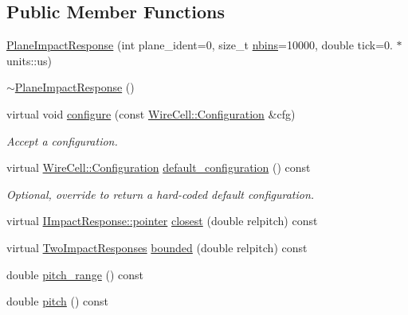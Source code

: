 \subsection*{Public Member Functions}
\begin{DoxyCompactItemize}
\item 
\hyperlink{class_wire_cell_1_1_gen_1_1_plane_impact_response_a47289d4ed5ce503243642044b47907fb}{Plane\+Impact\+Response} (int plane\+\_\+ident=0, size\+\_\+t \hyperlink{class_wire_cell_1_1_gen_1_1_plane_impact_response_ae6ff423372c28e1fec5e13a47d1648d2}{nbins}=10000, double tick=0. $\ast$units\+::us)
\item 
\hyperlink{class_wire_cell_1_1_gen_1_1_plane_impact_response_a3d10a9817c3f150e03b72181bea818c1}{$\sim$\+Plane\+Impact\+Response} ()
\item 
virtual void \hyperlink{class_wire_cell_1_1_gen_1_1_plane_impact_response_a5ab969666fea20210311a3751db47db0}{configure} (const \hyperlink{namespace_wire_cell_a9f705541fc1d46c608b3d32c182333ee}{Wire\+Cell\+::\+Configuration} \&cfg)
\begin{DoxyCompactList}\small\item\em Accept a configuration. \end{DoxyCompactList}\item 
virtual \hyperlink{namespace_wire_cell_a9f705541fc1d46c608b3d32c182333ee}{Wire\+Cell\+::\+Configuration} \hyperlink{class_wire_cell_1_1_gen_1_1_plane_impact_response_aa3ff90ee6b2da59981703b26ea36dd03}{default\+\_\+configuration} () const
\begin{DoxyCompactList}\small\item\em Optional, override to return a hard-\/coded default configuration. \end{DoxyCompactList}\item 
virtual \hyperlink{class_wire_cell_1_1_interface_a09c548fb8266cfa39afb2e74a4615c37}{I\+Impact\+Response\+::pointer} \hyperlink{class_wire_cell_1_1_gen_1_1_plane_impact_response_a1f0049663133e90f7c3b30f7dda63943}{closest} (double relpitch) const
\item 
virtual \hyperlink{namespace_wire_cell_ae163f7e69ff1625cf269418b35194d37}{Two\+Impact\+Responses} \hyperlink{class_wire_cell_1_1_gen_1_1_plane_impact_response_aa33dc4d2ab03046b055a8a8843fc07bd}{bounded} (double relpitch) const
\item 
double \hyperlink{class_wire_cell_1_1_gen_1_1_plane_impact_response_a6d35e0f23850e8b5922216bae603af5e}{pitch\+\_\+range} () const
\item 
double \hyperlink{class_wire_cell_1_1_gen_1_1_plane_impact_response_a350984012f21b48b8ab4515a371a3f8c}{pitch} () const

\end{DoxyCompactItemize}
